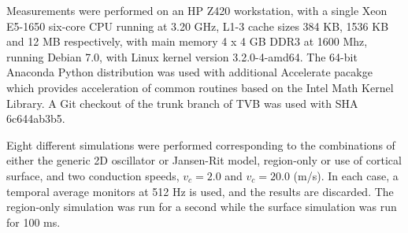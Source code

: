 	Measurements were
	performed on an HP Z420 workstation, with a single Xeon E5-1650
	six-core CPU running at 3.20 GHz, L1-3 cache sizes 384 KB, 1536 KB
	and 12 MB respectively, with main memory 4 x 4 GB DDR3 at 1600 Mhz,
	running Debian 7.0, with Linux kernel version 3.2.0-4-amd64. 
	The 64-bit Anaconda Python distribution was used with additional Accelerate
	pacakge which provides acceleration of common routines based on the 
	Intel Math Kernel Library. A Git checkout of the trunk branch of TVB 
	was used with SHA 6c644ab3b5.

	Eight different simulations were performed corresponding to the combinations of
	either the generic 2D oscillator or Jansen-Rit model, region-only
	or use of cortical surface, and two conduction speeds, $v_c = 2.0$ and
	$v_c = 20.0$ (m/s). In each case, a temporal average monitors at 512 Hz
	is used, and the results are discarded. The region-only simulation was
	run for a second while the surface simulation was run for 100 ms. 

